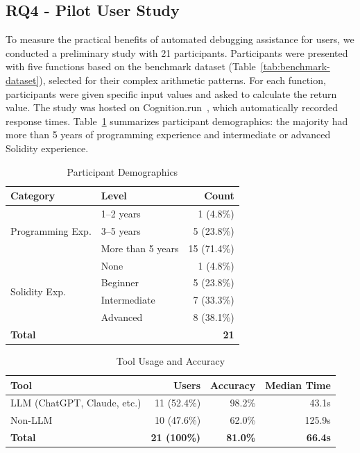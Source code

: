 \documentclass[pdflatex,sn-basic]{sn-jnl}%
\theoremstyle{thmstyleone}%
\theoremstyle{thmstyletwo}%
\theoremstyle{thmstylethree}%
\begin{document}
\subsection{RQ4 - Pilot User Study}

To measure the practical benefits of automated debugging assistance for users,
we conducted a preliminary study with 21 participants.
Participants were presented with five functions based on the benchmark dataset (Table~\ref{tab:benchmark-dataset}), selected for their complex arithmetic patterns.
For each function, participants were given specific input values and asked to calculate the return value.
The study was hosted on Cognition.run~\citep{cognition}, which automatically recorded response times.
Table~\ref{tab:rq4-demographics} summarizes participant demographics:
the majority had more than 5 years of programming experience and intermediate or advanced Solidity experience.

\begin{table}[!ht]
\centering
\caption{Participant Demographics}
\label{tab:rq4-demographics}
\small
\begin{tabular*}{\linewidth}{@{\extracolsep{\fill}}llr@{}}
\toprule
\textbf{Category} & \textbf{Level} & \textbf{Count} \\
\midrule
\multirow{3}{*}{Programming Exp.}
  & 1--2 years & 1 (4.8\%) \\
  & 3--5 years & 5 (23.8\%) \\
  & More than 5 years & 15 (71.4\%) \\
\midrule
\multirow{4}{*}{Solidity Exp.}
  & None & 1 (4.8\%) \\
  & Beginner & 5 (23.8\%) \\
  & Intermediate & 7 (33.3\%) \\
  & Advanced & 8 (38.1\%) \\
\midrule
\textbf{Total} & & \textbf{21} \\
\bottomrule
\end{tabular*}
\end{table}

\begin{table}[!ht]
\centering
\caption{Tool Usage and Accuracy}
\label{tab:rq4-tools}
\small
\begin{tabular*}{\linewidth}{@{\extracolsep{\fill}}lrrr@{}}
\toprule
\textbf{Tool} & \textbf{Users} & \textbf{Accuracy} & \textbf{Median Time} \\
\midrule
LLM (ChatGPT, Claude, etc.) & 11 (52.4\%) & 98.2\% & 43.1s \\
Non-LLM & 10 (47.6\%) & 62.0\% & 125.9s \\
\midrule
\textbf{Total} & \textbf{21 (100\%)} & \textbf{81.0\%} & \textbf{66.4s} \\
\bottomrule
\end{tabular*}
\end{table}
\end{document}
